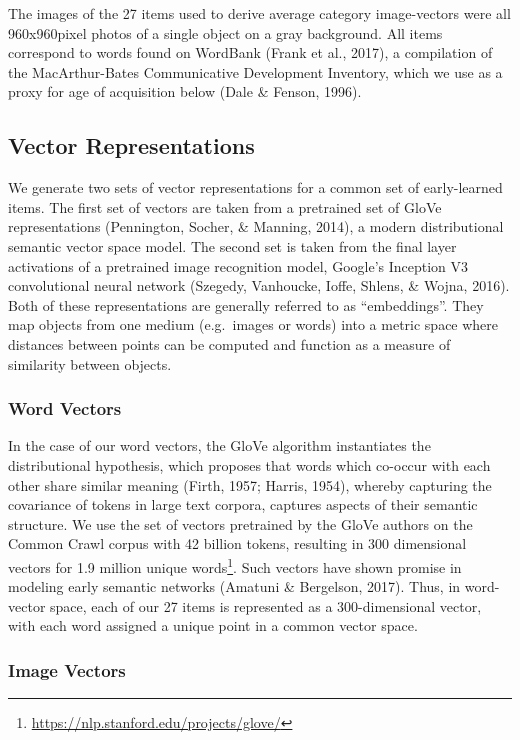 \documentclass[10pt, letterpaper]{article}
\begin{document}
The images of the 27 items used to derive average category image-vectors
were all 960x960pixel photos of a single object on a gray background.
All items correspond to words found on WordBank (Frank et al., 2017), a
compilation of the MacArthur-Bates Communicative Development Inventory,
which we use as a proxy for age of acquisition below (Dale \& Fenson,
1996).

\subsection{Vector Representations}\label{vector-representations}

We generate two sets of vector representations for a common set of
early-learned items. The first set of vectors are taken from a
pretrained set of GloVe representations (Pennington, Socher, \& Manning,
2014), a modern distributional semantic vector space model. The second
set is taken from the final layer activations of a pretrained image
recognition model, Google's Inception V3 convolutional neural network
(Szegedy, Vanhoucke, Ioffe, Shlens, \& Wojna, 2016). Both of these
representations are generally referred to as ``embeddings''. They map
objects from one medium (e.g.~images or words) into a metric space where
distances between points can be computed and function as a measure of
similarity between objects.

\subsubsection{Word Vectors}\label{word-vectors}

In the case of our word vectors, the GloVe algorithm instantiates the
distributional hypothesis, which proposes that words which co-occur with
each other share similar meaning (Firth, 1957; Harris, 1954), whereby
capturing the covariance of tokens in large text corpora, captures
aspects of their semantic structure. We use the set of vectors
pretrained by the GloVe authors on the Common Crawl corpus with 42
billion tokens, resulting in 300 dimensional vectors for 1.9 million
unique words\footnote{\url{https://nlp.stanford.edu/projects/glove/}}.
Such vectors have shown promise in modeling early semantic networks
(Amatuni \& Bergelson, 2017). Thus, in word-vector space, each of our 27
items is represented as a 300-dimensional vector, with each word
assigned a unique point in a common vector space.

\subsubsection{Image Vectors}\label{image-vectors}
\end{document}
